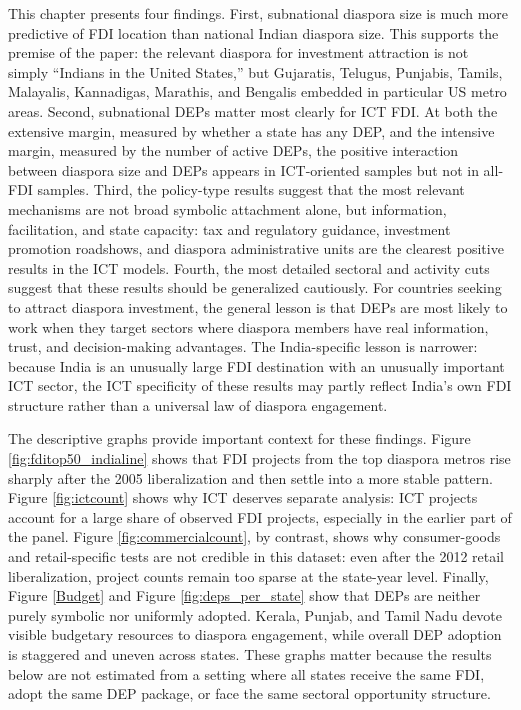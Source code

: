 \documentclass[doublespace,nopageskip]{UVAthesis}
\begin{document}
This chapter presents four findings. First, subnational diaspora size is much more predictive of FDI location than national Indian diaspora size. This supports the premise of the paper: the relevant diaspora for investment attraction is not simply ``Indians in the United States,'' but Gujaratis, Telugus, Punjabis, Tamils, Malayalis, Kannadigas, Marathis, and Bengalis embedded in particular US metro areas. Second, subnational DEPs matter most clearly for ICT FDI. At both the extensive margin, measured by whether a state has any DEP, and the intensive margin, measured by the number of active DEPs, the positive interaction between diaspora size and DEPs appears in ICT-oriented samples but not in all-FDI samples. Third, the policy-type results suggest that the most relevant mechanisms are not broad symbolic attachment alone, but information, facilitation, and state capacity: tax and regulatory guidance, investment promotion roadshows, and diaspora administrative units are the clearest positive results in the ICT models. Fourth, the most detailed sectoral and activity cuts suggest that these results should be generalized cautiously. For countries seeking to attract diaspora investment, the general lesson is that DEPs are most likely to work when they target sectors where diaspora members have real information, trust, and decision-making advantages. The India-specific lesson is narrower: because India is an unusually large FDI destination with an unusually important ICT sector, the ICT specificity of these results may partly reflect India's own FDI structure rather than a universal law of diaspora engagement.

The descriptive graphs provide important context for these findings. Figure \ref{fig:fditop50_indialine} shows that FDI projects from the top diaspora metros rise sharply after the 2005 liberalization and then settle into a more stable pattern. Figure \ref{fig:ictcount} shows why ICT deserves separate analysis: ICT projects account for a large share of observed FDI projects, especially in the earlier part of the panel. Figure \ref{fig:commercialcount}, by contrast, shows why consumer-goods and retail-specific tests are not credible in this dataset: even after the 2012 retail liberalization, project counts remain too sparse at the state-year level. Finally, Figure \ref{Budget} and Figure \ref{fig:deps_per_state} show that DEPs are neither purely symbolic nor uniformly adopted. Kerala, Punjab, and Tamil Nadu devote visible budgetary resources to diaspora engagement, while overall DEP adoption is staggered and uneven across states. These graphs matter because the results below are not estimated from a setting where all states receive the same FDI, adopt the same DEP package, or face the same sectoral opportunity structure.
\end{document}

